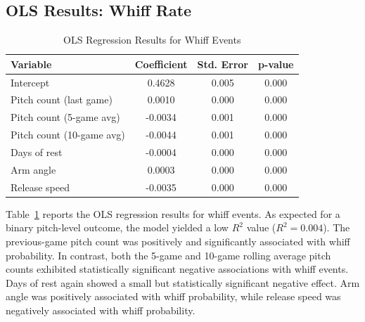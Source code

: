\documentclass[12pt, letterpaper]{article}
\begin{document}
\subsection{OLS Results: Whiff Rate}
\begin{table}[htbp]
\centering
\begin{tabular}{lccc}
\hline
Variable & Coefficient & Std. Error & p-value \\
\hline
Intercept & 0.4628 & 0.005 & 0.000 \\
Pitch count (last game) & 0.0010 & 0.000 & 0.000 \\
Pitch count (5-game avg) & -0.0034 & 0.001 & 0.000 \\
Pitch count (10-game avg) & -0.0044 & 0.001 & 0.000 \\
Days of rest & -0.0004 & 0.000 & 0.000 \\
Arm angle & 0.0003 & 0.000 & 0.000 \\
Release speed & -0.0035 & 0.000 & 0.000 \\
\hline
\end{tabular}
\caption{OLS Regression Results for Whiff Events}
\label{tab:whiff}
\end{table}
Table~\ref{tab:whiff} reports the OLS regression results for whiff events. 
As expected for a binary pitch-level outcome, the model yielded a low $R^2$ value ($R^2 = 0.004$). The previous-game pitch count was positively and significantly associated with whiff probability. In contrast, both the 5-game and 10-game rolling average pitch counts exhibited statistically significant negative associations with whiff events. Days of rest again showed a small but statistically significant negative effect. Arm angle was positively associated with whiff probability, while release speed was negatively associated with whiff probability.
\end{document}
